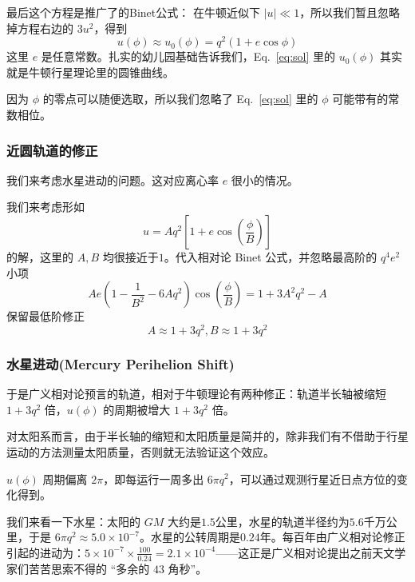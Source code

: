 \documentclass[CJK,13pt]{beamer}
\begin{document}
  \begin{frame}
    最后这个方程是推广了的Binet公式：
    在牛顿近似下 $|u| \ll 1$，所以我们暂且忽略掉方程右边的 $3u^2$，得到
    \begin{equation}
      u(\phi) \approx u_0(\phi) = q^2 (1+e\cos\phi) \label{eq:sol}
    \end{equation}
    这里 $e$ 是任意常数。扎实的幼儿园基础告诉我们，Eq.~\eqref{eq:sol} 里的 $u_0(\phi)$ 其实就是牛顿行星理论里的圆锥曲线。

    {\scriptsize 因为 $\phi$ 的零点可以随便选取，所以我们忽略了 Eq.~\eqref{eq:sol} 里的 $\phi$ 可能带有的常数相位。}
  \end{frame}

  
  \begin{frame}
    \frametitle{近圆轨道的修正}
    我们来考虑水星进动的问题。这对应离心率 $e$ 很小的情况。

    我们来考虑形如
    $$ u = Aq^2\left[1+e\cos\left(\frac{\phi}{B}\right)\right]$$
    的解，这里的 $A,B$ 均很接近于$1$。代入相对论 Binet 公式，并忽略最高阶的 $q^4e^2$ 小项
    $$ Ae \left(1 -\frac{1}{B^2}-6Aq^2\right)\cos\left(\frac{\phi}{B}\right) = 1 + 3A^2q^2-A$$
    保留最低阶修正
    $$ A \approx 1+3q^2, B\approx 1+3q^2$$
  \end{frame}
  
  \begin{frame}
    \frametitle{水星进动(Mercury Perihelion Shift)}
    于是广义相对论预言的轨道，相对于牛顿理论有两种修正：轨道半长轴被缩短 $1+3q^2$ 倍，$u(\phi)$ 的周期被增大 $1+3q^2$ 倍。

    \skiplines

    对太阳系而言，由于半长轴的缩短和太阳质量是简并的，除非我们有不借助于行星运动的方法测量太阳质量，否则就无法验证这个效应。

    \skiplines
    
    $u(\phi)$ 周期偏离 $2\pi$，即每运行一周多出 $6\pi q^2$，可以通过观测行星近日点方位的变化得到。

    我们来看一下水星：太阳的 $GM$ 大约是$1.5$公里，水星的轨道半径约为$5.6$千万公里，于是 $6\pi q^2\approx 5.0\times 10^{-7}$。水星的公转周期是$0.24$年。每百年由广义相对论修正引起的进动为：$5\times 10^{-7}\times\frac{100}{0.24}=2.1\times 10^{-4}$——这正是广义相对论提出之前天文学家们苦苦思索不得的 “多余的 $43$ 角秒”。
  \end{frame}


\end{document}
